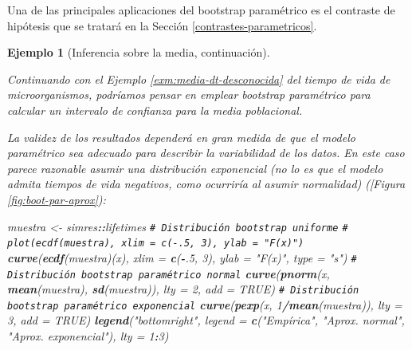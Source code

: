 \documentclass[
  spanish,
  10pt,
]{book}
\newenvironment{Shaded}{\begin{snugshade}}{\end{snugshade}}
\newcommand{\AttributeTok}[1]{\textcolor[rgb]{0.13,0.29,0.53}{#1}}
\newcommand{\CommentTok}[1]{\textcolor[rgb]{0.56,0.35,0.01}{\textit{#1}}}
\newcommand{\ConstantTok}[1]{\textcolor[rgb]{0.56,0.35,0.01}{#1}}
\newcommand{\DecValTok}[1]{\textcolor[rgb]{0.00,0.00,0.81}{#1}}
\newcommand{\FunctionTok}[1]{\textcolor[rgb]{0.13,0.29,0.53}{\textbf{#1}}}
\newcommand{\NormalTok}[1]{#1}
\newcommand{\OtherTok}[1]{\textcolor[rgb]{0.56,0.35,0.01}{#1}}
\newcommand{\SpecialCharTok}[1]{\textcolor[rgb]{0.81,0.36,0.00}{\textbf{#1}}}
\newcommand{\StringTok}[1]{\textcolor[rgb]{0.31,0.60,0.02}{#1}}
\theoremstyle{break}
\newtheorem{example}{Ejemplo}[chapter]
\theoremstyle{nonumberplain}
\renewcommand{\CommentTok}[1]{\textcolor[rgb]{0.41,0.41,0.41}{\texttt{#1}}}
\begin{document}
Una de las principales aplicaciones del bootstrap paramétrico
es el contraste de hipótesis que se tratará en la Sección \ref{contrastes-parametricos}.

\begin{example}[Inferencia sobre la media, continuación]
\protect\hypertarget{exm:media-par}{}\label{exm:media-par}

Continuando con el Ejemplo \ref{exm:media-dt-desconocida} del tiempo de vida de microorganismos, podríamos pensar en emplear bootstrap paramétrico para calcular un intervalo de confianza para la media poblacional.

La validez de los resultados dependerá en gran medida de que el modelo paramétrico sea adecuado para describir la variabilidad de los datos.
En este caso parece razonable asumir una distribución exponencial (no lo es que el modelo admita tiempos de vida negativos, como ocurriría al asumir normalidad) ({[}Figura \ref{fig:boot-par-aprox}):

\begin{Shaded}
\begin{Highlighting}[]
\NormalTok{muestra }\OtherTok{\textless{}{-}}\NormalTok{ simres}\SpecialCharTok{::}\NormalTok{lifetimes}
\CommentTok{\# Distribución bootstrap uniforme}
\CommentTok{\# plot(ecdf(muestra), xlim = c({-}.5, 3), ylab = "F(x)")}
\FunctionTok{curve}\NormalTok{(}\FunctionTok{ecdf}\NormalTok{(muestra)(x), }\AttributeTok{xlim =} \FunctionTok{c}\NormalTok{(}\SpecialCharTok{{-}}\NormalTok{.}\DecValTok{5}\NormalTok{, }\DecValTok{3}\NormalTok{), }\AttributeTok{ylab =} \StringTok{"F(x)"}\NormalTok{, }\AttributeTok{type =} \StringTok{"s"}\NormalTok{)}
\CommentTok{\# Distribución bootstrap paramétrico normal}
\FunctionTok{curve}\NormalTok{(}\FunctionTok{pnorm}\NormalTok{(x, }\FunctionTok{mean}\NormalTok{(muestra), }\FunctionTok{sd}\NormalTok{(muestra)), }\AttributeTok{lty =} \DecValTok{2}\NormalTok{, }\AttributeTok{add =} \ConstantTok{TRUE}\NormalTok{)}
\CommentTok{\# Distribución bootstrap paramétrico exponencial}
\FunctionTok{curve}\NormalTok{(}\FunctionTok{pexp}\NormalTok{(x, }\DecValTok{1}\SpecialCharTok{/}\FunctionTok{mean}\NormalTok{(muestra)), }\AttributeTok{lty =} \DecValTok{3}\NormalTok{, }\AttributeTok{add =} \ConstantTok{TRUE}\NormalTok{)}
\FunctionTok{legend}\NormalTok{(}\StringTok{"bottomright"}\NormalTok{, }\AttributeTok{legend =} \FunctionTok{c}\NormalTok{(}\StringTok{"Empírica"}\NormalTok{, }\StringTok{"Aprox. normal"}\NormalTok{, }\StringTok{"Aprox. exponencial"}\NormalTok{), }
       \AttributeTok{lty =} \DecValTok{1}\SpecialCharTok{:}\DecValTok{3}\NormalTok{)}
\end{Highlighting}
\end{Shaded}


\end{example}
\end{document}
